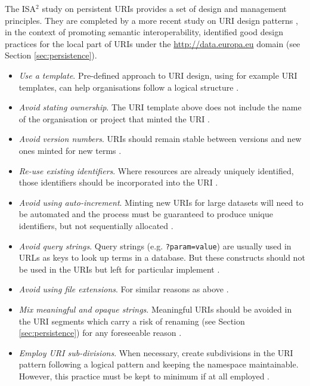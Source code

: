 	The ISA$^2$ study on persistent URIs \cite{d7.1.3-2012} provides a set of design and management principles. They are completed by a more recent study on URI design patterns \citep{d4.02.02-2018}, in the context of promoting semantic interoperability, identified good design practices for the local part of URIs under the \url{http://data.europa.eu} domain (see Section \ref{sec:persistence}).
	
	\begin{itemize}
		\item \textit{Use a template}. Pre-defined approach to URI design, using for example URI templates, can help organisations follow a logical structure \cite{d7.1.3-2012,d4.02.02-2018}.
		\item \textit{Avoid stating ownership}. The URI template above does not include the name of the organisation or project that minted the URI \cite{d7.1.3-2012,d4.02.02-2018}.
		\item \textit{Avoid version numbers}. URIs should remain stable between versions and new ones minted for new terms \cite{d7.1.3-2012,d4.02.02-2018}.
		\item \textit{Re-use existing identifiers}. Where resources are already uniquely identified, those identifiers should be incorporated into the URI \cite{d7.1.3-2012}.
		\item \textit{Avoid using auto-increment}. Minting new URIs for large datasets will need to be automated and the process must be guaranteed to produce unique identifiers, but not sequentially allocated \cite{d7.1.3-2012}. 
		\item \textit{Avoid query strings}. Query strings (e.g. \texttt{?param=value}) are usually used in URLs as keys to look up terms in a database. But these constructs should not be used in the URIs but left for particular implement \cite{d7.1.3-2012}. 
		\item \textit{Avoid using file extensions}. For similar reasons as above \cite{d7.1.3-2012}. 
		\item \textit{Mix meaningful and opaque strings}. Meaningful URIs should be avoided in the URI segments which carry a risk of renaming (see Section \ref{sec:persistence}) for any foreseeable reason \cite{d4.02.02-2018}.  
		\item \textit{Employ URI sub-divisions}. When necessary, create subdivisions in the URI pattern following a logical pattern and keeping the namespace maintainable. However, this practice must be kept to minimum if at all employed \cite{d4.02.02-2018}. 		
	\end{itemize}
	

